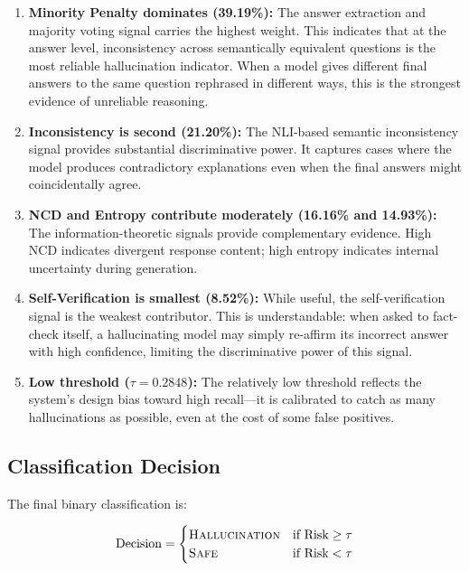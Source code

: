 \begin{enumerate}
    \item \textbf{Minority Penalty dominates (39.19\%):} The answer extraction and majority voting signal carries the highest weight. This indicates that at the answer level, inconsistency across semantically equivalent questions is the most reliable hallucination indicator. When a model gives different final answers to the same question rephrased in different ways, this is the strongest evidence of unreliable reasoning.

    \item \textbf{Inconsistency is second (21.20\%):} The NLI-based semantic inconsistency signal provides substantial discriminative power. It captures cases where the model produces contradictory explanations even when the final answers might coincidentally agree.

    \item \textbf{NCD and Entropy contribute moderately (16.16\% and 14.93\%):} The information-theoretic signals provide complementary evidence. High NCD indicates divergent response content; high entropy indicates internal uncertainty during generation.

    \item \textbf{Self-Verification is smallest (8.52\%):} While useful, the self-verification signal is the weakest contributor. This is understandable: when asked to fact-check itself, a hallucinating model may simply re-affirm its incorrect answer with high confidence, limiting the discriminative power of this signal.

    \item \textbf{Low threshold ($\tau = 0.2848$):} The relatively low threshold reflects the system's design bias toward high recall---it is calibrated to catch as many hallucinations as possible, even at the cost of some false positives.
\end{enumerate}

\subsection{Classification Decision}

The final binary classification is:

\begin{equation}
    \text{Decision} = \begin{cases}
        \textsc{Hallucination} & \text{if } \text{Risk} \geq \tau \\
        \textsc{Safe} & \text{if } \text{Risk} < \tau
    \end{cases}
    \label{eq:decision}
\end{equation}

